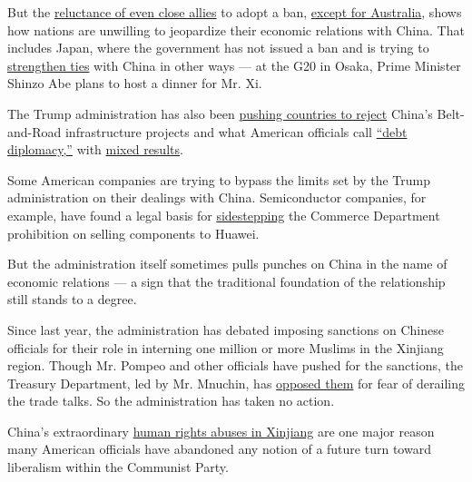 But the
\href{https://www.nytimes3xbfgragh.onion/2019/03/17/us/politics/huawei-ban.html}{reluctance
of even close allies} to adopt a ban,
\href{https://www.nytimes3xbfgragh.onion/2018/08/23/technology/huawei-banned-australia-5g.html}{except
for Australia}, shows how nations are unwilling to jeopardize their
economic relations with China. That includes Japan, where the government
has not issued a ban and is trying to
\href{https://www.cnbc.com/2019/06/25/japan-abe-and-china-xi-look-to-strengthen-ties-at-g-20-as-trump-looms.html}{strengthen
ties} with China in other ways --- at the G20 in Osaka, Prime Minister
Shinzo Abe plans to host a dinner for Mr. Xi.

The Trump administration has also been
\href{https://www.nytimes3xbfgragh.onion/2019/01/13/world/africa/china-loans-africa-usa.html}{pushing
countries to reject} China's Belt-and-Road infrastructure projects and
what American officials call
\href{https://www.nytimes3xbfgragh.onion/2018/06/25/world/asia/china-sri-lanka-port.html}{``debt
diplomacy,''} with
\href{https://www.nytimes3xbfgragh.onion/2019/03/23/world/europe/italy-china-xi-silk-road.html}{mixed
results}.

Some American companies are trying to bypass the limits set by the Trump
administration on their dealings with China. Semiconductor companies,
for example, have found a legal basis for
\href{https://www.nytimes3xbfgragh.onion/2019/06/25/technology/huawei-trump-ban-technology.html}{sidestepping}
the Commerce Department prohibition on selling components to Huawei.

But the administration itself sometimes pulls punches on China in the
name of economic relations --- a sign that the traditional foundation of
the relationship still stands to a degree.

Since last year, the administration has debated imposing sanctions on
Chinese officials for their role in interning one million or more
Muslims in the Xinjiang region. Though Mr. Pompeo and other officials
have pushed for the sanctions, the Treasury Department, led by Mr.
Mnuchin, has
\href{https://www.nytimes3xbfgragh.onion/2019/05/04/world/asia/trump-china-uighurs-trade-deal.html}{opposed
them} for fear of derailing the trade talks. So the administration has
taken no action.

China's extraordinary
\href{https://www.nytimes3xbfgragh.onion/2018/09/08/world/asia/china-uighur-muslim-detention-camp.html}{human
rights abuses in Xinjiang} are one major reason many American officials
have abandoned any notion of a future turn toward liberalism within the
Communist Party.

